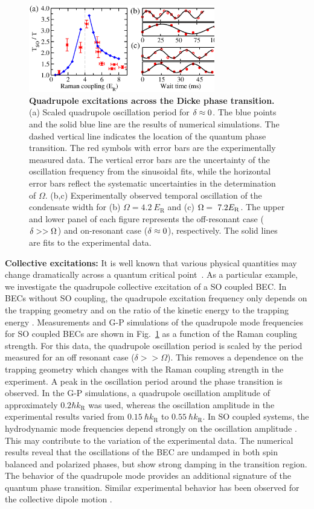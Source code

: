 \documentclass[prl,aps,twocolumn,floatfix]{revtex4}
\begin{document}
\begin{figure}[tbp]
\includegraphics[width=3.2in]{Figure-5Engels.eps}
\caption{\textbf{Quadrupole excitations across the Dicke
phase transition.} (a) Scaled quadrupole oscillation period for $\protect%
\delta \approx 0$. The blue points and the solid blue line are the results
of numerical simulations. The dashed vertical line indicates the location of
the quantum phase transition. The red symbols with error bars are the
experimentally measured data. The vertical error bars are the uncertainty of
the oscillation frequency from the sinusoidal fits, while the horizontal
error bars reflect the systematic uncertainties in the determination of $%
\Omega $. (b,c) Experimentally observed temporal oscillation of the
condensate width for (b) $\Omega =4.2~E_{\text{R}}$ and (c) $\Omega =~7.2E_{%
\text{R}}$. The upper and lower panel of each figure represents the
off-resonant case ($\protect\delta >>\Omega $) and on-resonant case ($%
\protect\delta \approx 0$), respectively. The solid lines are fits to the
experimental data.}
\label{Fig5}
\end{figure}

\textbf{Collective excitations:}  It is well known that various physical quantities may
change dramatically across a quantum critical point~\cite{Sachdev}. As a
particular example, we investigate the quadrupole collective excitation of a
SO coupled BEC. In BECs without SO coupling, the quadrupole excitation
frequency only depends on the trapping geometry and on the ratio of the
kinetic energy to the trapping energy \cite{Stringari2}. Measurements and
G-P simulations of the quadrupole mode frequencies for SO coupled BECs are
shown in Fig.~\ref{Fig5} as a function of the Raman coupling strength. For
this data, the quadrupole oscillation period is scaled by the period
measured for an off resonant case ($\delta >> \Omega$). This removes a
dependence on the trapping geometry which changes with the Raman coupling
strength in the experiment. A peak in the oscillation period around the
phase transition is observed. In the G-P simulations, a quadrupole
oscillation amplitude of approximately $0.2\hbar k_{\text{R}}$ was used,
whereas the oscillation amplitude in the experimental results varied from $%
0.15~\hbar k_{\text{R}}$ to $0.55~\hbar k_{\text{R}}$. In SO coupled
systems, the hydrodynamic mode frequencies depend strongly on the
oscillation amplitude \cite{Pan}. This may contribute to the variation of
the experimental data. The numerical results reveal that the oscillations of
the BEC are undamped in both spin balanced and polarized phases, but show
strong damping in the transition region. The behavior of the quadrupole mode
provides an additional signature of the quantum phase transition. Similar
experimental behavior has been observed for the collective dipole motion \cite{Pan}.
\end{document}
